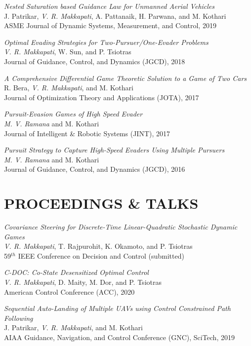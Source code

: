 \documentclass[margin, 10pt]{res} %
\begin{document}
\begin{resume}
{\sl Nested Saturation based Guidance Law for Unmanned Aerial Vehicles} \\
J. Patrikar, \textit{V. R. Makkapati}, A. Pattanaik, H. Parwana, and M. Kothari \\
ASME Journal of Dynamic Systems, Measurement, and Control, 2019

{\sl Optimal Evading Strategies for Two-Pursuer/One-Evader Problems} \\
\textit{V. R. Makkapati}, W. Sun, and P. Tsiotras \\
Journal of Guidance, Control, and Dynamics (JGCD), 2018

{\sl A Comprehensive Differential Game Theoretic Solution to a Game of Two Cars} \\ 
R. Bera, \textit{V. R. Makkapati}, and M. Kothari \\
Journal of Optimization Theory and Applications (JOTA), 2017 

{\sl Pursuit-Evasion Games of High Speed Evader} \\ 
\textit{M. V. Ramana} and M. Kothari \\
Journal of Intelligent \& Robotic Systems (JINT), 2017

{\sl Pursuit Strategy to Capture High-Speed Evaders Using Multiple Pursuers} \\
\textit{M. V. Ramana} and M. Kothari \\
Journal of Guidance, Control, and Dynamics (JGCD), 2016

\section{PROCEEDINGS \& TALKS}

{\sl Covariance Steering for Discrete-Time Linear-Quadratic Stochastic Dynamic Games}\\
\textit{V. R. Makkapati}, T. Rajpurohit, K. Okamoto, and P. Tsiotras \\
59$^{th}$ IEEE Conference on Decision and Control (submitted)

{\sl C-DOC: Co-State Desensitized Optimal Control}\\
\textit{V. R. Makkapati}, D. Maity, M. Dor, and P. Tsiotras\\
American Control Conference (ACC), 2020

{\sl Sequential Auto-Landing of Multiple UAVs using Control Constrained Path Following} \\
J. Patrikar, \textit{V. R. Makkapati}, and M. Kothari \\
AIAA Guidance, Navigation, and Control Conference (GNC), SciTech, 2019 


\end{resume}
\end{document}
